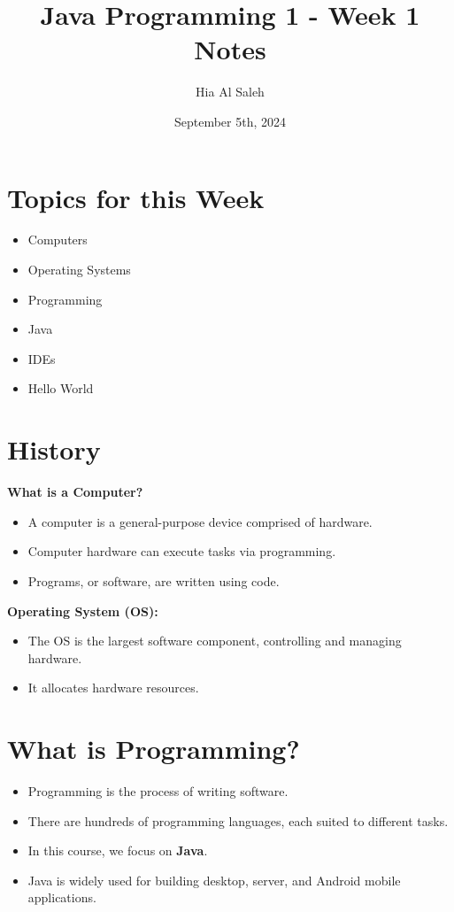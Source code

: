 \documentclass{article}
\title{Java Programming 1 - Week 1 Notes}
\author{Hia Al Saleh}
\date{September 5th, 2024}
\begin{document}
\maketitle
\tableofcontents
\newpage
\section{Topics for this Week}
\begin{itemize}
    \item Computers
    \item Operating Systems
    \item Programming
    \item Java
    \item IDEs
    \item Hello World
\end{itemize}

\section{History}
\textbf{What is a Computer?}
\begin{itemize}
    \item A computer is a general-purpose device comprised of hardware.
    \item Computer hardware can execute tasks via programming.
    \item Programs, or software, are written using code.
\end{itemize}

\textbf{Operating System (OS):}
\begin{itemize}
    \item The OS is the largest software component, controlling and managing hardware.
    \item It allocates hardware resources.
\end{itemize}

\section{What is Programming?}
\begin{itemize}
    \item Programming is the process of writing software.
    \item There are hundreds of programming languages, each suited to different tasks.
    \item In this course, we focus on \textbf{Java}.
    \item Java is widely used for building desktop, server, and Android mobile applications.
\end{itemize}
\end{document}
